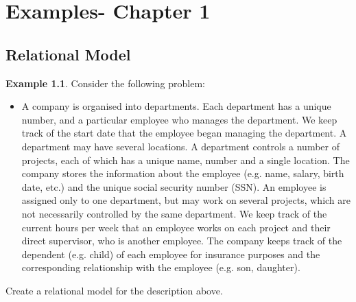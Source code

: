 \documentclass[a4paper, openany]{memoir}
\theoremstyle{definition}
\newtheorem{example}[subsection]{Example}
\begin{document}
    \chapter{Examples- Chapter 1}
    \setcounter{section}{1}
    \section{Relational Model}
    \begin{example}
        Consider the following problem:
        \begin{itemize}[label=]
            \item A company is organised into departments. Each department has a unique number, and a particular employee who manages the department. We keep track of the start date that the employee began managing the department. A department may have several locations. A department controls a number of projects, each of which has a unique name, number and a single location. The company stores the information about the employee (e.g. name, salary, birth date, etc.) and the unique social security number (SSN). An employee is assigned only to one department, but may work on several projects, which are not necessarily controlled by the same department. We keep track of the current hours per week that an employee works on each project and their direct supervisor, who is another employee. The company keeps track of the dependent (e.g. child) of each employee for insurance purposes and the corresponding relationship with the employee (e.g. son, daughter).
        \end{itemize}
        Create a relational model for the description above.
    \end{example}
\end{document}
